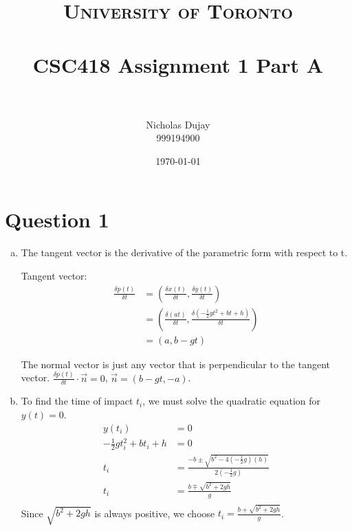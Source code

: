 \documentclass{article} %
\title{
\normalfont \normalsize
\textsc{University of Toronto} \\ [25pt] %
\horrule{0.5pt} \\[0.4cm] %
\huge CSC418 Assignment 1 Part A \\ %
\horrule{2pt} \\[0.5cm] %
}
\author{Nicholas Dujay\\999194900} %
\date{\normalsize\today} %
\begin{document}
\maketitle %


\section{Question 1}

\begin{enumerate}[a)]

\item

The tangent vector is the derivative of the parametric form with respect to t.

Tangent vector:
\begin{align*}
\frac{\delta p(t)}{\delta t} &= \left(\frac{\delta x(t)}{\delta t}, \frac{\delta y(t)}{\delta t}\right)\\
&= \left(\frac{\delta (at)}{\delta t}, \frac{\delta (-\frac{1}{2}gt^2 + bt + h)}{\delta t}\right)\\
&= (a, b - gt)
\end{align*}

The normal vector is just any vector that is perpendicular to the tangent vector. $\frac{\delta p(t)}{\delta t} \cdot \vec{n} = 0$, $\vec{n} = (b - gt, -a)$.


\item

To find the time of impact $t_i$, we must solve the quadratic equation for $y(t) = 0$.
\begin{align*}
y(t_i) &= 0\\
-\frac{1}{2}gt_i^2 + bt_i + h &= 0\\
t_i &= \frac{-b \pm \sqrt{b^2 - 4(-\frac{1}{2}g)(h)} }{2(-\frac{1}{2}g)}\\
t_i &= \frac{b \mp \sqrt{b^2 + 2gh} }{g}\\
\end{align*}
Since $\sqrt{b^2 + 2gh}$ is always positive, we choose $t_i = \frac{b + \sqrt{b^2 + 2gh} }{g}$.


\end{enumerate}
\end{document}
